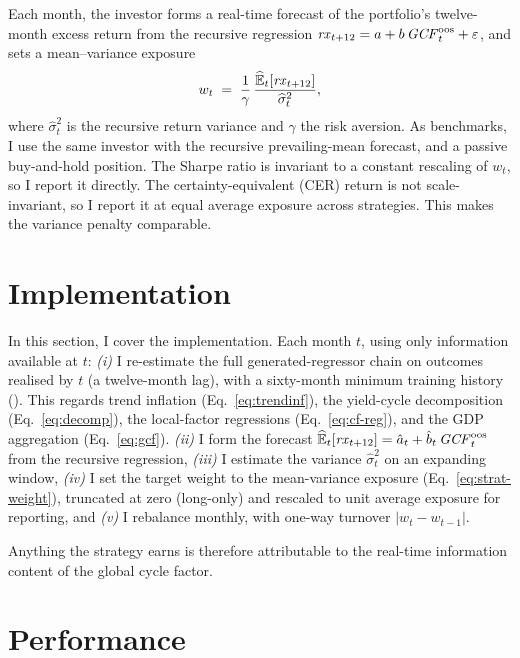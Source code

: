 Each month, the investor forms a real-time forecast of the portfolio's
twelve-month excess return from the recursive regression
$\mathit{rx}_{t+12}=a+b\,\mathit{GCF}^{\mathrm{oos}}_{t}+\varepsilon$, and sets a mean--variance exposure
\begin{equation}
  w_{t} \;=\; \frac{1}{\gamma}\,
              \frac{\widehat{\mathbb{E}}_{t}\!\left[\mathit{rx}_{t+12}\right]}
                   {\widehat{\sigma}^{2}_{t}},
  \label{eq:strat-weight}
\end{equation}
where $\widehat{\sigma}^{2}_{t}$ is the recursive return variance and $\gamma$
the risk aversion. As benchmarks, I use the same
investor with the recursive prevailing-mean forecast, and a passive
buy-and-hold position. The Sharpe ratio is invariant to a constant rescaling
of $w_{t}$, so I report it directly. The certainty-equivalent (CER) return is
not scale-invariant, so I report it at equal average exposure across
strategies. This makes the variance penalty comparable.

\section{Implementation}
\label{sec:strat-implementation}

In this section, I cover the implementation. Each
month $t$, using only information available at $t$: \emph{(i)} I re-estimate
the full generated-regressor chain on outcomes realised by $t$ (a twelve-month
lag), with a sixty-month minimum training history (). This
regards trend inflation (Eq.~\ref{eq:trendinf}), the yield-cycle decomposition
(Eq.~\ref{eq:decomp}), the local-factor regressions (Eq.~\ref{eq:cf-reg}), and the GDP aggregation (Eq.~\ref{eq:gcf}). \emph{(ii)} I form the forecast
$\widehat{\mathbb{E}}_{t}[\mathit{rx}_{t+12}]=\hat a_{t}+\hat b_{t}\,\mathit{GCF}^{\mathrm{oos}}_{t}$
from the recursive regression, \emph{(iii)} I estimate the variance
$\widehat{\sigma}^{2}_{t}$ on an expanding window, \emph{(iv)} I set the
target weight to the mean-variance exposure (Eq.~\ref{eq:strat-weight}), truncated
at zero (long-only) and rescaled to unit average exposure for reporting, and
\emph{(v)} I rebalance monthly, with one-way turnover $|w_{t}-w_{t-1}|$.

Anything the strategy earns is therefore attributable to the real-time
information content of the global cycle factor.

\section{Performance}
\label{sec:strat-performance}

